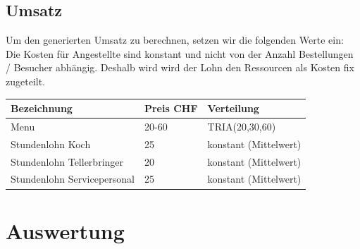 \documentclass[ngerman,a4paper,12pt]{scrreprt}
\begin{document}
	\section{Umsatz}
\noindent
	Um den generierten Umsatz zu berechnen, setzen wir die folgenden Werte ein:
Die Kosten für Angestellte sind konstant und nicht von der Anzahl Bestellungen / Besucher abhängig. Deshalb wird wird der Lohn den Ressourcen als Kosten fix zugeteilt.

\begin{tabularx}{\textwidth}{|l|l|X|}
		\hline
		\textbf{Bezeichnung} & \textbf{Preis CHF} & \textbf{Verteilung}  \\
		\hline
		Menu & 20-60 & TRIA(20,30,60)  \\
		\hline
		Stundenlohn Koch & 25 & konstant (Mittelwert)\\
		Stundenlohn Tellerbringer & 20 & konstant (Mittelwert) \\
		Stundenlohn Servicepersonal & 25 & konstant (Mittelwert)\\
		\hline
\end{tabularx}
	
\chapter{Auswertung}
\end{document}
